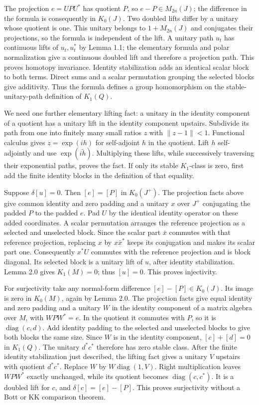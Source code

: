 \documentclass[
  11pt,
]{article}
\begin{document}
The projection \(e=UPU^*\) has quotient \(P\), so \(e-P\in M_{2n}(J)\);
the difference in the formula is consequently in \(K_0(J)\). Two doubled
lifts differ by a unitary whose quotient is one. This unitary belongs to
\(1+M_{2n}(J)\) and conjugates their projections, so the formula is
independent of the lift. A unitary path \(u_t\) has continuous lifts of
\(u_t,u_t^*\) by Lemma 1.1; the elementary formula and polar
normalization give a continuous doubled lift and therefore a projection
path. This proves homotopy invariance. Identity stabilization adds an
identical scalar block to both terms. Direct sums and a scalar
permutation grouping the selected blocks give additivity. Thus the
formula defines a group homomorphism on the stable-unitary-path
definition of \(K_1(Q)\).

We need one further elementary lifting fact: a unitary in the identity
component of a quotient has a unitary lift in the identity component
upstairs. Subdivide its path from one into finitely many small ratios
\(z\) with \(\|z-1\|<1\). Functional calculus gives \(z=\exp(ih)\) for
self-adjoint \(h\) in the quotient. Lift \(h\) self-adjointly and use
\(\exp(i\widetilde h)\). Multiplying these lifts, while successively
traversing their exponential paths, proves the fact. If only its stable
\(K_1\)-class is zero, first add the finite identity blocks in the
definition of that equality.

Suppose \(\delta[u]=0\). Then \([e]=[P]\) in \(K_0(J^+)\). The
projection facts above give common identity and zero padding and a
unitary \(x\) over \(J^+\) conjugating the padded \(P\) to the padded
\(e\). Pad \(U\) by the identical identity operator on these added
coordinates. A scalar permutation arranges the reference projection as a
selected and unselected block. Since the scalar part \(\bar x\) commutes
with that reference projection, replacing \(x\) by \(x\bar x^*\) keeps
its conjugation and makes its scalar part one. Consequently \(x^*U\)
commutes with the reference projection and is block diagonal. Its
selected block is a unitary lift of \(u\), after identity stabilization.
Lemma 2.0 gives \(K_1(M)=0\); thus \([u]=0\). This proves injectivity.

For surjectivity take any normal-form difference \([e]-[P]\in K_0(J)\).
Its image is zero in \(K_0(M)\), again by Lemma 2.0. The projection
facts give equal identity and zero padding and a unitary \(W\) in the
identity component of a matrix algebra over \(M\), with \(WPW^*=e\). In
the quotient it commutes with \(P\), so it is
\(\operatorname{diag}(c,d)\). Add identity padding to the selected and
unselected blocks to give both blocks the same size. Since \(W\) is in
the identity component, \([c]+[d]=0\) in \(K_1(Q)\). The unitary
\(d^*c^*\) therefore has zero stable class. After the finite identity
stabilization just described, the lifting fact gives a unitary \(V\)
upstairs with quotient \(d^*c^*\). Replace \(W\) by
\(W\operatorname{diag}(1,V)\). Right multiplication leaves \(WPW^*\)
exactly unchanged, while its quotient becomes
\(\operatorname{diag}(c,c^*)\). It is a doubled lift for \(c\), and
\(\delta[c]=[e]-[P]\). This proves surjectivity without a Bott or KK
comparison theorem.
\end{document}
